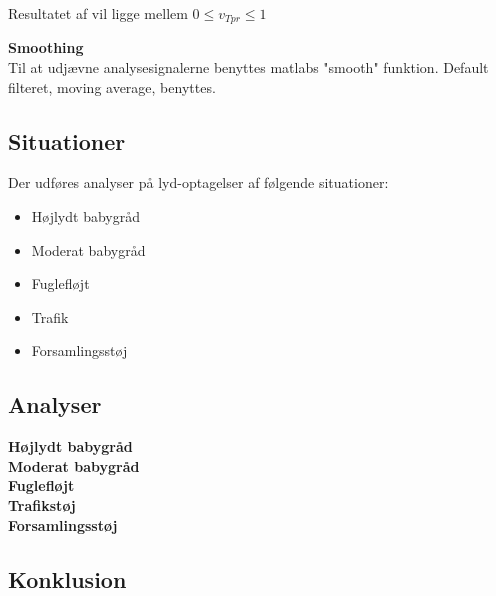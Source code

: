 Resultatet af vil ligge mellem $0\le { v }_{ Tpr }\le 1$

\textbf{Smoothing} \\
Til at udjævne analysesignalerne benyttes matlabs "smooth" funktion. Default filteret, moving average, benyttes.

\subsection{Situationer}
Der udføres analyser på lyd-optagelser af følgende situationer:
\begin{itemize}
	\item Højlydt babygråd
	\item Moderat babygråd
	\item Fuglefløjt
	\item Trafik
	\item Forsamlingsstøj
\end{itemize} 

\subsection{Analyser}
\textbf{Højlydt babygråd} \\

\newpage
\textbf{Moderat babygråd}\\

\newpage
\textbf{Fuglefløjt}\\

\newpage
\textbf{Trafikstøj}\\

\newpage
\textbf{Forsamlingsstøj}\\


\subsection{Konklusion}

